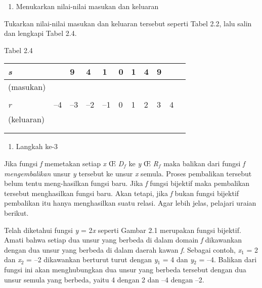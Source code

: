 \documentclass[11pt,fleqn]{book} %
\begin{document}
\begin{myEnumerate}
\begin{itemize}
\begin{enumerate}
\item  Menukarkan nilai-nilai masukan dan keluaran
\end{enumerate}

\noindent Tukarkan nilai-nilai masukan dan keluaran tersebut seperti Tabel 2.2, lalu salin dan lengkapi Tabel 2.4.

\noindent \textbf{}

\noindent Tabel 2.4

\noindent 

\begin{tabular}{|p{0.6in}|p{0.4in}|p{0.3in}|p{0.2in}|p{0.2in}|p{0.2in}|p{0.2in}|p{0.2in}|p{0.2in}|p{0.2in}|p{0.2in}|} \hline 
\textit{s}  &  & 9 & 4 & 1 & 0 & 1 & 4 & 9 &  \\ \hline 
 (masukan) &  &  &  &  &  &  &  &  &  \\ \hline 
 &  &  &  &  &  &  &  &  &  &  \\ \hline 
\textit{r}  & --4 & --3 & --2 & --1 & 0 & 1 & 2 & 3 & 4 \\ \hline 
 (keluaran) &  &  &  &  &  &  &  &  &  \\ \hline 
 &  &  &  &  &  &  &  &  &  &  \\ \hline 
 &  &  &  &  &  &  &  &  &  &  \\ \hline 
\end{tabular}



\noindent 

\begin{enumerate}
\item  Langkah ke-3
\end{enumerate}

Jika fungsi \textit{f} memetakan setiap \textit{x} {\OE} \textit{D${}_{f}$} ke \textit{y} {\OE} \textit{R${}_{f}$} maka balikan dari fungsi \textit{f} \textit{mengembalikan} unsur \textit{y} tersebut ke unsur \textit{x }semula. Proses pembalikan tersebut belum tentu meng-hasilkan fungsi baru. Jika \textit{f} fungsi bijektif maka pembalikan tersebut menghasilkan fungsi baru. Akan tetapi, jika \textit{f} bukan fungsi bijektif pembalikan itu hanya menghasilkan suatu relasi. Agar lebih jelas, pelajari uraian berikut.

Telah diketahui fungsi \textit{y} = 2\textit{x} seperti Gambar 2.1 merupakan fungsi bijektif. Amati bahwa setiap dua unsur yang berbeda di dalam domain \textit{f} dikawankan dengan dua unsur yang berbeda di dalam daerah kawan \textit{f}. Sebagai contoh, \textit{x}${}_{1}$ = 2 dan \textit{x}${}_{2}$ = --2 dikawankan berturut turut dengan \textit{y}${}_{1}$ = 4 dan \textit{y}${}_{2}$ = --4. Balikan dari fungsi ini akan menghubungkan dua unsur yang berbeda tersebut dengan dua unsur semula yang berbeda, yaitu 4 dengan 2 dan --4 dengan --2.


\end{itemize}
\end{myEnumerate}
\end{document}
